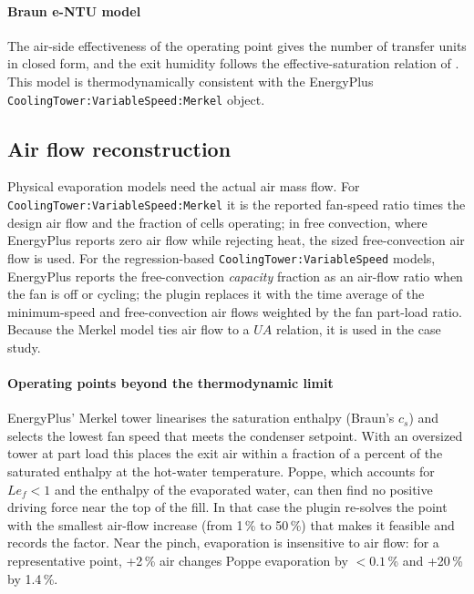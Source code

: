 \documentclass[preprint,12pt,authoryear]{elsarticle}
\begin{document}
\paragraph{Braun e-NTU model} The air-side effectiveness of the operating point gives the number of transfer units in
closed form, and the exit humidity follows the effective-saturation relation of \citet{braun1989effectiveness}. This
model is thermodynamically consistent with the EnergyPlus \texttt{CoolingTower:VariableSpeed:Merkel} object.

\subsection{Air flow reconstruction}\label{sec:airflow}
Physical evaporation models need the actual air mass flow. For \texttt{CoolingTower:VariableSpeed:Merkel} it is
the reported fan-speed ratio times the design air flow and the fraction of cells operating; in free convection, where
EnergyPlus reports zero air flow while rejecting heat, the sized free-convection air flow is used. For the regression-based
\texttt{CoolingTower:VariableSpeed} models, EnergyPlus reports the free-convection \emph{capacity} fraction as an
air-flow ratio when the fan is off or cycling; the plugin replaces it with the time average of the minimum-speed and
free-convection air flows weighted by the fan part-load ratio. Because the Merkel model ties air flow to a $UA$
relation, it is used in the case study.

\paragraph{Operating points beyond the thermodynamic limit}
EnergyPlus' Merkel tower linearises the saturation enthalpy (Braun's $c_s$) and selects the lowest fan speed that meets
the condenser setpoint. With an oversized tower at part load this places the exit air within a fraction of a percent of
the saturated enthalpy at the hot-water temperature. Poppe, which accounts for $Le_f<1$ and the enthalpy of the evaporated
water, can then find no positive driving force near the top of the fill. In that case the plugin re-solves the point with
the smallest air-flow increase (from 1\,\% to 50\,\%) that makes it feasible and records the factor. Near the pinch,
evaporation is insensitive to air flow: for a representative point, +2\,\% air changes Poppe evaporation by $<0.1$\,\% and
+20\,\% by 1.4\,\%.
\end{document}
